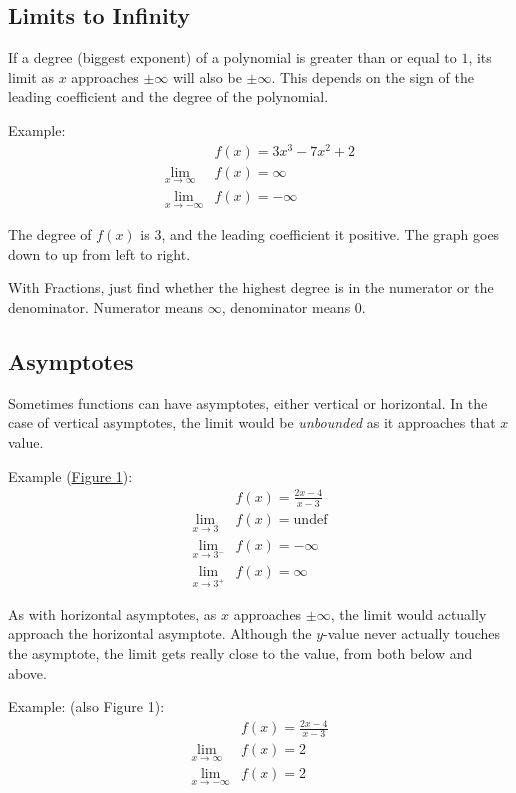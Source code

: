 \documentclass[12pt]{article}
\begin{document}
\subsection{Limits to Infinity}

If a degree (biggest exponent) of a polynomial is greater than or equal to $1$, its limit as $x$ approaches $\pm\infty$ will also be $\pm\infty$. This depends on the sign of the leading coefficient and the degree of the polynomial.

\noindent Example:
\begin{align*}
                         & f(x) = 3x^3 - 7x^2 + 2 \\
    \lim_{x \to \infty}  & f(x) = \infty          \\
    \lim_{x \to -\infty} & f(x) = -\infty
\end{align*}

The degree of $f(x)$ is $3$, and the leading coefficient it positive. The graph goes down to up from left to right.

With Fractions, just find whether the highest degree is in the numerator or the denominator. Numerator means $\infty$, denominator means $0$.

\subsection{Asymptotes}
Sometimes functions can have asymptotes, either vertical or horizontal. In the case of vertical asymptotes, the limit would be \textit{unbounded} as it approaches that $x$ value.

\noindent Example (\hyperref[fig:limasymptote]{Figure 1}):
\begin{align*}
                     & f(x) = \frac{2x-4}{x-3} \\
    \lim_{x \to 3}   & f(x) = \text{undef}     \\
    \lim_{x \to 3^-} & f(x) = -\infty          \\
    \lim_{x \to 3^+} & f(x) = \infty
\end{align*}

As with horizontal asymptotes, as $x$ approaches $\pm \infty$, the limit would actually approach the horizontal asymptote. Although the $y$-value never actually touches the asymptote, the limit gets really close to the value, from both below and above.

\noindent Example: (also Figure 1):
\begin{align*}
                         & f(x) = \frac{2x-4}{x-3} \\
    \lim_{x \to \infty}  & f(x) = 2                \\
    \lim_{x \to -\infty} & f(x) = 2
\end{align*}
\end{document}
